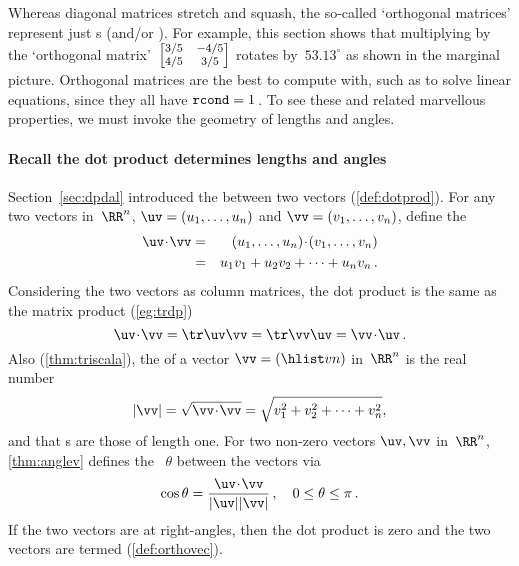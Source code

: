 Whereas diagonal matrices stretch and squash, the so-called 
`orthogonal matrices' represent just s (and/or ).
%
For example, this section shows that multiplying by the `orthogonal matrix'~\(\footnotesize\begin{bmatrix} 3/5&-4/5\\4/5&3/5 \end{bmatrix}\) rotates by~\(53.13^\circ\) as shown in the marginal picture.
Orthogonal matrices are the best to compute with, such as to solve linear equations, since they all have \(\verb|rcond|=1\)\,.
To see these and related marvellous properties, we must invoke the geometry of lengths and angles.


\paragraph{Recall the dot product determines lengths and angles}
Section~\ref{sec:dpdal} introduced the  between two vectors (\autoref{def:dotprod}).
For any two vectors in~\(\RR^n\), $\uv=(u_1,\ldots,u_n)$ and $\vv=(v_1,\ldots,v_n)$,
define the  
\begin{eqnarray*}
\uv\cdot \vv&=&(u_1,\ldots,u_n)\cdot (v_1,\ldots,v_n)
\\&=& u_1v_1+u_2v_2+\cdots+u_nv_n\,.
\end{eqnarray*}
Considering the two vectors as column matrices, the dot product is the same as the matrix product (\autoref{eg:trdp})
\begin{equation*}
\uv\cdot\vv=\tr\uv\vv=\tr\vv\uv=\vv\cdot\uv\,.
\end{equation*}
Also (\autoref{thm:triscala}), the  of a vector \(\vv=(\hlist vn)\) in~\(\RR^n\) is the real number  
\begin{equation*}
|\vv|=\sqrt{\vv\cdot\vv}=\sqrt{v_1^2+v_2^2+\cdots+v_n^2},
\end{equation*}
and that s are those of length one.
For two non-zero vectors \(\uv,\vv\) in~\(\RR^n\), \autoref{thm:anglev} defines the ~\(\theta\) between the vectors via 
\begin{equation*}
\cos\theta=\frac{\uv\cdot\vv}{|\uv||\vv|}\,,
\quad 0\leq\theta\leq\pi\,.
\end{equation*}
If the two vectors are at right-angles, then the dot product is zero and the two vectors are termed  (\autoref{def:orthovec}).









